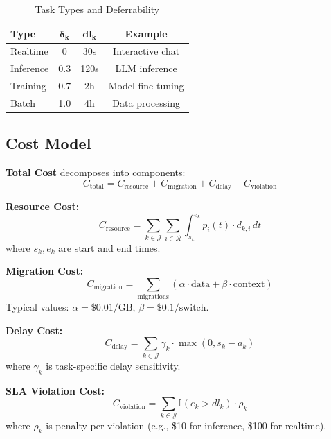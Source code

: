 \documentclass[10pt,conference]{IEEEtran}
\begin{document}
\begin{table}[t]
\centering
\caption{Task Types and Deferrability}
\label{tab:tasks}
\begin{tabular}{@{}lccc@{}}
\toprule
\textbf{Type} & $\boldsymbol{\delta_k}$ & $\boldsymbol{dl_k}$ & \textbf{Example} \\ \midrule
Realtime & 0 & 30s & Interactive chat \\
Inference & 0.3 & 120s & LLM inference \\
Training & 0.7 & 2h & Model fine-tuning \\
Batch & 1.0 & 4h & Data processing \\ \bottomrule
\end{tabular}
\end{table}

\subsection{Cost Model}

\textbf{Total Cost} decomposes into components:
\begin{equation}
C_{\text{total}} = C_{\text{resource}} + C_{\text{migration}} + C_{\text{delay}} + C_{\text{violation}}
\end{equation}

\textbf{Resource Cost:}
\begin{equation}
C_{\text{resource}} = \sum_{k \in \mathcal{J}} \sum_{i \in \mathcal{R}} \int_{s_k}^{e_k} p_i(t) \cdot d_{k,i} \, dt
\end{equation}
where $s_k, e_k$ are start and end times.

\textbf{Migration Cost:}
\begin{equation}
C_{\text{migration}} = \sum_{\text{migrations}} (\alpha \cdot \text{data} + \beta \cdot \text{context})
\end{equation}
Typical values: $\alpha = \$0.01/\text{GB}$, $\beta = \$0.1/\text{switch}$.

\textbf{Delay Cost:}
\begin{equation}
C_{\text{delay}} = \sum_{k \in \mathcal{J}} \gamma_k \cdot \max(0, s_k - a_k)
\end{equation}
where $\gamma_k$ is task-specific delay sensitivity.

\textbf{SLA Violation Cost:}
\begin{equation}
C_{\text{violation}} = \sum_{k \in \mathcal{J}} \mathbb{I}(e_k > dl_k) \cdot \rho_k
\end{equation}
where $\rho_k$ is penalty per violation (e.g., \$10 for inference, \$100 for realtime).
\end{document}
